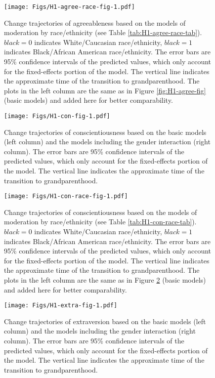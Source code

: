 \documentclass[
  english,
  man,floatsintext]{apa7}
\begin{document}
\begin{figure}
\centering
\texttt{[image: Figs/H1-agree-race-fig-1.pdf]}
\caption{\label{fig:H1-agree-race-fig}Change trajectories of agreeableness based on the models of moderation by race/ethnicity (see Table \ref{tab:H1-agree-race-tab}). \(black=0\) indicates White/Caucasian race/ethnicity, \(black=1\) indicates Black/African American race/ethnicity. The error bars are 95\% confidence intervals of the predicted values, which only account for the fixed-effects portion of the model. The vertical line indicates the approximate time of the transition to grandparenthood. The plots in the left column are the same as in Figure \ref{fig:H1-agree-fig} (basic models) and added here for better comparability.}
\end{figure}



\begin{figure}
\centering
\texttt{[image: Figs/H1-con-fig-1.pdf]}
\caption{\label{fig:H1-con-fig}Change trajectories of conscientiousness based on the basic models (left column) and the models including the gender interaction (right column). The error bars are 95\% confidence intervals of the predicted values, which only account for the fixed-effects portion of the model. The vertical line indicates the approximate time of the transition to grandparenthood.}
\end{figure}



\begin{figure}
\centering
\texttt{[image: Figs/H1-con-race-fig-1.pdf]}
\caption{\label{fig:H1-con-race-fig}Change trajectories of conscientiousness based on the models of moderation by race/ethnicity (see Table \ref{tab:H1-con-race-tab}). \(black=0\) indicates White/Caucasian race/ethnicity, \(black=1\) indicates Black/African American race/ethnicity. The error bars are 95\% confidence intervals of the predicted values, which only account for the fixed-effects portion of the model. The vertical line indicates the approximate time of the transition to grandparenthood. The plots in the left column are the same as in Figure \ref{fig:H1-con-fig} (basic models) and added here for better comparability.}
\end{figure}



\begin{figure}
\centering
\texttt{[image: Figs/H1-extra-fig-1.pdf]}
\caption{\label{fig:H1-extra-fig}Change trajectories of extraversion based on the basic models (left column) and the models including the gender interaction (right column). The error bars are 95\% confidence intervals of the predicted values, which only account for the fixed-effects portion of the model. The vertical line indicates the approximate time of the transition to grandparenthood.}
\end{figure}
\end{document}

